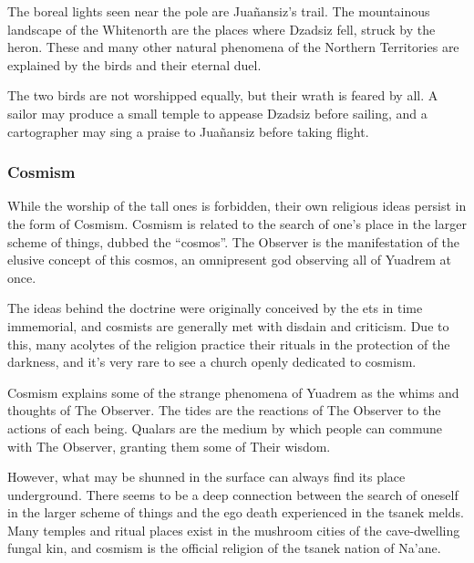 The boreal lights seen near the pole are Jua\~nansiz's trail.
The mountainous landscape of the Whitenorth are the places where Dzadsiz fell, struck by the heron.
These and many other natural phenomena of the Northern Territories are explained by the birds and their eternal duel.

The two birds are not worshipped equally, but their wrath is feared by all.
A sailor may produce a small temple to appease Dzadsiz before sailing, and a cartographer may sing a praise to Jua\~nansiz before taking flight.

\subsubsection{Cosmism}
While the worship of the tall ones is forbidden, their own religious ideas persist in the form of Cosmism.
Cosmism is related to the search of one's place in the larger scheme of things, dubbed the ``cosmos''.
The Observer is the manifestation of the elusive concept of this cosmos, an omnipresent god observing all of Yuadrem at once.

The ideas behind the doctrine were originally conceived by the ets in time immemorial, and cosmists are generally met with disdain and criticism.
Due to this, many acolytes of the religion practice their rituals in the protection of the darkness, and it's very rare to see a church openly dedicated to cosmism.

Cosmism explains some of the strange phenomena of Yuadrem as the whims and thoughts of The Observer.
The tides are the reactions of The Observer to the actions of each being.
Qualars are the medium by which people can commune with The Observer, granting them some of Their wisdom.


However, what may be shunned in the surface can always find its place underground.
There seems to be a deep connection between the search of oneself in the larger scheme of things and the ego death experienced in the tsanek melds.
Many temples and ritual places exist in the mushroom cities of the cave-dwelling fungal kin, and cosmism is the official religion of the tsanek nation of Na'ane.
